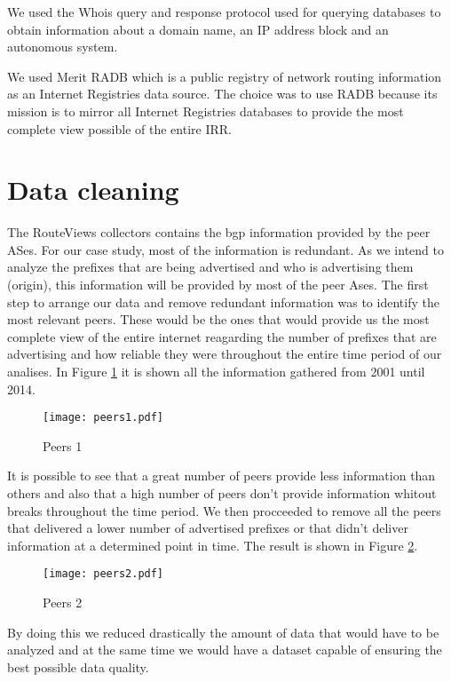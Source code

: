 \documentclass[11pt,a4paper]{scrreprt}
\begin{document}
We used the Whois \cite{Whois} query and response protocol used for querying databases to obtain information about a domain name, an IP address block and an autonomous system. 

We used Merit RADB \cite{RADB} which is a public registry of network routing information as an Internet Registries data source. The choice was to use RADB because its mission is to mirror all Internet Registries  databases to provide the most complete view possible of the entire IRR. 

\section{Data cleaning}
The RouteViews collectors contains the bgp information provided by the peer ASes. For our case study, most of the information is redundant. As we intend to analyze the prefixes that are being advertised and who is advertising them (origin), this information will be provided by most of the peer Ases. The first step to arrange our data and remove redundant information was to identify the most relevant peers. These would be the ones that would provide us the most complete view of the entire internet reagarding the number of prefixes that are advertising and how reliable they were throughout the entire time period of our analises. In Figure \ref{fig:peers1} it is shown all the information gathered from 2001 until 2014. 

\begin{figure}[!h]
\centering
\texttt{[image: peers1.pdf]}
\caption{Peers 1}
\label{fig:peers1}
\end{figure}

It is possible to see that a great number of peers provide less information than others and also that a high number of peers don't provide information whitout breaks throughout the time period. We then procceeded to remove all the peers that delivered a lower number of advertised prefixes or that didn't deliver information at a determined point in time. The result is shown in Figure \ref{fig:peers2}.  

\begin{figure}[!h]
\centering
\texttt{[image: peers2.pdf]}
\caption{Peers 2}
\label{fig:peers2}
\end{figure}

By doing this we reduced drastically the amount of data that would have to be analyzed and at the same time we would have a dataset capable of ensuring the best possible data quality. 
\end{document}
